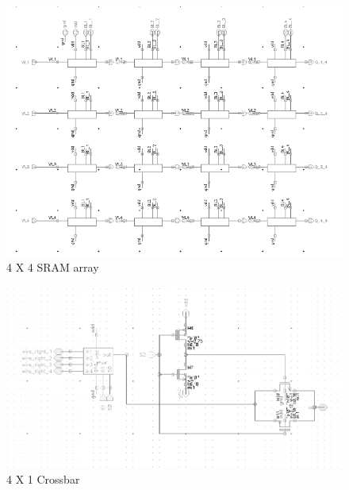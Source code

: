 \begin{figure}[H]
\centering
\includegraphics[scale=0.7]{sram_array.png}
\caption{4 X 4 SRAM array}
\label{fig:Figure}
\end{figure}
\begin{figure}[H]
\centering
\includegraphics[scale=0.55]{4_1_crossbar.png}
\caption{4 X 1 Crossbar}
\label{fig:Figure}
\end{figure}

